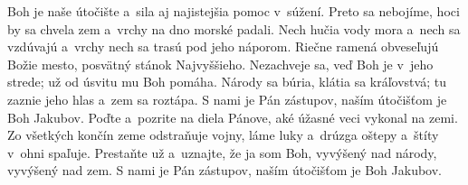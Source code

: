 Boh je naše útočište a~sila
aj najistejšia pomoc v~súžení.
\versseparator
Preto sa nebojíme, hoci by sa chvela zem
a~vrchy na dno morské padali.
\versseparator
Nech hučia vody mora a~nech sa vzdúvajú
a~vrchy nech sa trasú pod jeho náporom.
\versseparator
Riečne ramená obveseľujú Božie mesto,
posvätný stánok Najvyššieho.
\versseparator
Nezachveje sa, veď Boh je v~jeho strede;
už od úsvitu mu Boh pomáha.
\versseparator
Národy sa búria, klátia sa kráľovstvá;
tu zaznie jeho hlas a~zem sa roztápa.
\versseparator
S nami je Pán zástupov,
naším útočišťom je Boh Jakubov.
\versseparator
Poďte a~pozrite na diela Pánove,
aké úžasné veci vykonal na zemi.
Zo všetkých končín zeme odstraňuje vojny,
\versseparator
láme luky a~drúzga oštepy
a~štíty v~ohni spaľuje.
\versseparator
Prestaňte už a~uznajte, že ja som Boh,
vyvýšený nad národy, vyvýšený nad zem.
\versseparator
S nami je Pán zástupov,
naším útočišťom je Boh Jakubov.